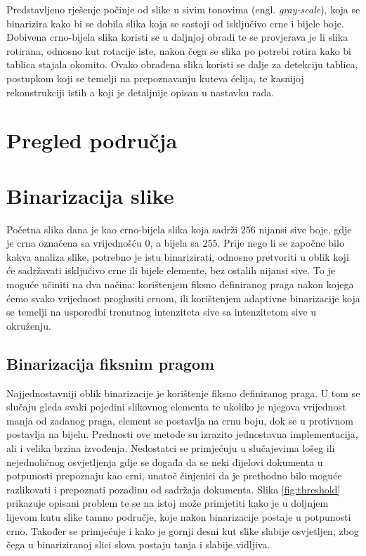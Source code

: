 \documentclass[times, utf8, zavrsni, numeric]{fer}
\begin{document}
Predstavljeno rješenje počinje od slike u sivim tonovima (engl. \textit{gray-scale}), koja se binarizira kako bi se dobila slika koja se sastoji od isključivo crne i bijele boje.
Dobivena crno-bijela slika koristi se u daljnjoj obradi te se provjerava je li slika rotirana, odnosno kut rotacije iste, nakon čega se slika po potrebi rotira kako bi tablica stajala okomito.
Ovako obrađena slika koristi se dalje za detekciju tablica, postupkom koji se temelji na prepoznavanju kuteva ćelija, te kasnijoj rekonstrukciji istih a koji je detaljnije opisan u nastavku rada.


\chapter{Pregled područja}

\chapter{Binarizacija slike}
Početna slika dana je kao crno-bijela slika koja sadrži $256$ nijansi sive boje, gdje je crna označena sa vrijednošću $0$, a bijela sa $255$.
Prije nego li se započne bilo kakva analiza slike, potrebno je istu binarizirati, odnosno pretvoriti u oblik koji će sadržavati isključivo crne ili bijele elemente, bez ostalih nijansi sive.
To je moguće učiniti na dva načina: korištenjem fiksno definiranog praga nakon kojega ćemo svako vrijednost proglasiti crnom, ili korištenjem adaptivne binarizacije koja se temelji na usporedbi trenutnog intenziteta sive sa intenzitetom sive u okruženju.

\section{Binarizacija fiksnim pragom}
Najjednostavniji oblik binarizacije je korištenje fiksno definiranog praga.
U tom se slučaju gleda svaki pojedini slikovnog elementa te ukoliko je njegova vrijednost manja od zadanog praga, element se postavlja na crnu boju, dok se u protivnom postavlja na bijelu.
Prednosti ove metode su izrazito jednostavna implementacija, ali i velika brzina izvođenja. 
Nedostatci se primjećuju u slučajevima lošeg ili nejednoličnog osvjetljenja gdje se događa da se neki dijelovi dokumenta u potpunosti prepoznaju kao crni, unatoč činjenici da je prethodno bilo moguće razlikovati i prepoznati pozadinu od sadržaja dokumenta.
Slika \ref{fig:threshold} prikazuje opisani problem te se na istoj može primjetiti kako je u doljnjem lijevom kutu slike tamno područje, koje nakon binarizacije postaje u potpunosti crno. 
Također se primjećuje i kako je gornji desni kut slike slabije osvjetljen, zbog čega u binariziranoj slici slova postaju tanja i slabije vidljiva.\\
\end{document}
